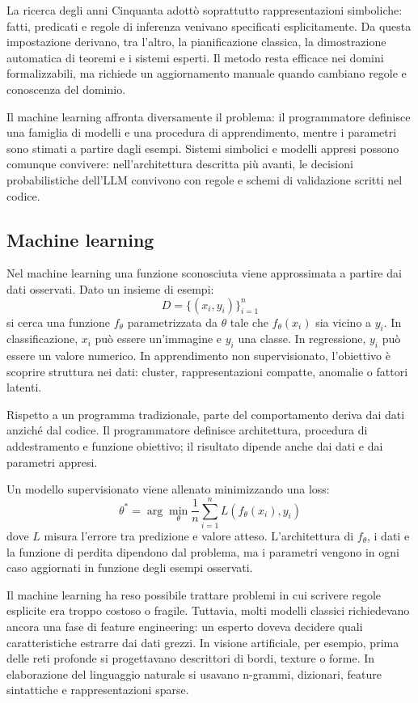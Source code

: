 La ricerca degli anni Cinquanta adottò soprattutto rappresentazioni simboliche:
fatti, predicati e regole di inferenza venivano specificati esplicitamente. Da
questa impostazione derivano, tra l'altro, la pianificazione classica, la
dimostrazione automatica di teoremi e i sistemi esperti. Il metodo resta efficace
nei domini formalizzabili, ma richiede un aggiornamento manuale quando cambiano
regole e conoscenza del dominio.

Il machine learning affronta diversamente il problema: il programmatore definisce
una famiglia di modelli e una procedura di apprendimento, mentre i parametri sono
stimati a partire dagli esempi. Sistemi simbolici e modelli appresi possono
comunque convivere: nell'architettura descritta
più avanti, le decisioni probabilistiche dell'LLM convivono con regole e schemi
di validazione scritti nel codice.

\subsection{Machine learning}

Nel machine learning una funzione sconosciuta viene approssimata a partire dai
dati osservati. Dato un insieme di esempi:
\[
    D = \{(x_i, y_i)\}_{i=1}^{n}
\]
si cerca una funzione $f_\theta$ parametrizzata da $\theta$ tale che $f_\theta(x_i)$ sia vicino a $y_i$. In classificazione, $x_i$ può essere un'immagine e $y_i$ una classe. In regressione, $y_i$ può essere un valore numerico. In apprendimento non supervisionato, l'obiettivo è scoprire struttura nei dati: cluster, rappresentazioni compatte, anomalie o fattori latenti.

Rispetto a un programma tradizionale, parte del comportamento deriva dai dati
anziché dal codice. Il programmatore definisce architettura, procedura di
addestramento e funzione obiettivo; il risultato dipende anche dai dati e dai
parametri appresi.

Un modello supervisionato viene allenato minimizzando una loss:
\[
    \theta^* = \arg\min_\theta \frac{1}{n} \sum_{i=1}^{n} L(f_\theta(x_i), y_i)
\]
dove $L$ misura l'errore tra predizione e valore atteso. L'architettura di
$f_\theta$, i dati e la funzione di perdita dipendono dal problema, ma i
parametri vengono in ogni caso aggiornati in funzione degli esempi osservati.

Il machine learning ha reso possibile trattare problemi in cui scrivere regole esplicite era troppo costoso o fragile. Tuttavia, molti modelli classici richiedevano ancora una fase di feature engineering: un esperto doveva decidere quali caratteristiche estrarre dai dati grezzi. In visione artificiale, per esempio, prima delle reti profonde si progettavano descrittori di bordi, texture o forme. In elaborazione del linguaggio naturale si usavano n-grammi, dizionari, feature sintattiche e rappresentazioni sparse.

